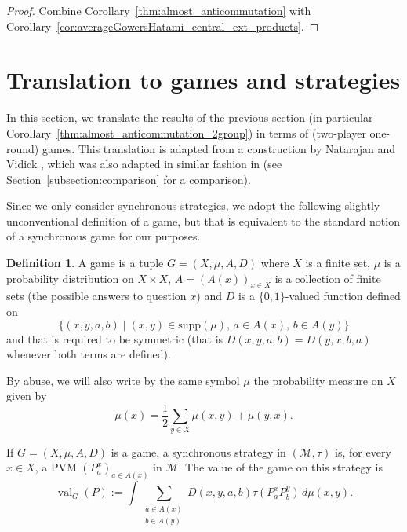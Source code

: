 \documentclass[JEP,XML,SOM,Unicode,published]{cedram}
\theoremstyle{plain}
\theoremstyle{definition}
\newtheorem{definition}[theorem]{Definition}
\newcommand{\cM}{\mathcal{M}}
\DeclareMathOperator{\val}{val}
\begin{document}
\begin{proof} Combine Corollary~\ref{thm:almost_anticommutation} with Corollary~\ref{cor:averageGowersHatami_central_ext_products}.
\end{proof}

\section{Translation to games and strategies}\label{section:games}
In this section, we translate the results of the previous section (in particular Corollary~\ref{thm:almost_anticommutation_2group}) in terms of (two-player one-round) games. This translation is adapted from a construction by Natarajan and Vidick \cite{MR3678246}, which was also adapted in similar fashion in \cite{MIPRE} (see Section~\ref{subsection:comparison} for a comparison).

Since we only consider synchronous strategies, we adopt the following slightly unconventional definition of a game, but that is equivalent to the standard notion of a synchronous game for our purposes.
\begin{definition}\label{def:game} A game is a tuple $G=(X,\mu,A,D)$ where $X$ is a finite set, $\mu$ is a probability distribution on $X\times X$, $A=(A(x))_{x \in X}$ is a collection of finite sets (the possible answers to question $x$) and $D$ is a $\{0,1\}$-valued function defined on
\[
\{(x,y,a,b)\mid (x,y) \in \mathrm{supp}(\mu),\, a \in A(x),\, b \in A(y)\}
\]
and that is required to be symmetric (that is $D(x,y,a,b)=D(y,x,b,a)$ whenever both terms are defined).
\end{definition}
By abuse, we will also write by the same symbol $\mu$ the probability measure on $X$ given by
\[
\mu(x) = \frac{1}{2} \sum_{y \in X} \mu(x,y)+\mu(y,x).
\]

If $G=(X,\mu,A,D)$ is a game, a synchronous strategy in $(\cM,\tau)$ is, for every $x \in X$, a PVM $(P^x_a)_{a \in A(x)}$ in $\cM$. The value of the game on this strategy is
\[
\val_G(P):=\int \sum_{\substack{a \in A(x)\\ b \in A(y)}} D(x,y,a,b) \tau(P^x_a P^y_b) \,d\mu(x,y).
\]
\end{document}
